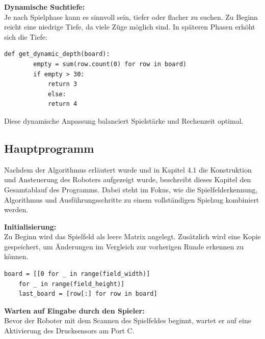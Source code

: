 \textbf{Dynamische Suchtiefe:}\\
Je nach Spielphase kann es sinnvoll sein, tiefer oder flacher zu suchen. Zu Beginn reicht eine niedrige Tiefe, da viele Züge möglich sind. In späteren Phasen erhöht sich die Tiefe:

\begin{lstlisting}[style=pythonstyle]
	def get_dynamic_depth(board):
		empty = sum(row.count(0) for row in board)
		if empty > 30:
			return 3
			else:
			return 4
\end{lstlisting}

Diese dynamische Anpassung balanciert Spielstärke und Rechenzeit optimal.



\subsection{Hauptprogramm}

Nachdem der Algorithmus erläutert wurde und in Kapitel 4.1 die Konstruktion und Ansteuerung des Roboters aufgezeigt wurde, beschreibt dieses Kapitel den Gesamtablauf des Programms. Dabei steht im Fokus, wie die Spielfelderkennung, Algorithmus und Ausführungsschritte zu einem vollständigen Spielzug kombiniert werden.

\textbf{Initialisierung:}\\
Zu Beginn wird das Spielfeld als leere Matrix angelegt. Zusätzlich wird eine Kopie gespeichert, um Änderungen im Vergleich zur vorherigen Runde erkennen zu können.

\begin{lstlisting}[style=pythonstyle]
	board = [[0 for _ in range(field_width)] 
	for _ in range(field_height)]
	last_board = [row[:] for row in board]
\end{lstlisting}

\textbf{Warten auf Eingabe durch den Spieler:}\\
Bevor der Roboter mit dem Scannen des Spielfeldes beginnt, wartet er auf eine Aktivierung des Drucksensors am Port C.

